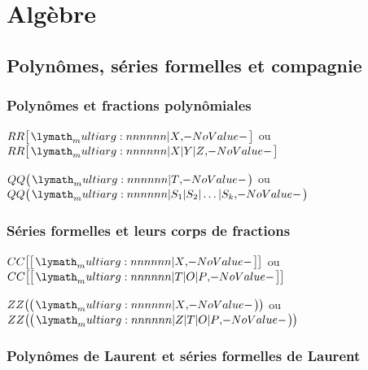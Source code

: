 \documentclass[12pt,a4paper]{article}
\newcommand\ZZ{ZZ}
\newcommand\QQ{QQ}
\newcommand\RR{RR}
\newcommand\CC{CC}
\begin{document}
\section{Algèbre}

\subsection{Polynômes, séries formelles et compagnie}

\subsubsection{Polynômes et fractions polynômiales}


\begin{latexex}
$\setpoly{\RR}{X}$
ou
$\setpoly{\RR}{X | Y | Z}$
\end{latexex}





\begin{latexex}
$\setpolyfrac{\QQ}{T}$
ou
$\setpolyfrac{\QQ}%
             {S_1 | S_2 | \dots | S_k}$
\end{latexex}




\subsubsection{Séries formelles et leurs corps de fractions}


\begin{latexex}
$\setserie{\CC}{X}$
ou
$\setserie{\CC}{T | O | P}$
\end{latexex}





\begin{latexex}
$\setseriefrac{\ZZ}{X}$
ou
$\setseriefrac{\ZZ}{Z | T | O | P}$
\end{latexex}




\subsubsection{Polynômes de Laurent et séries formelles de Laurent}
\end{document}
